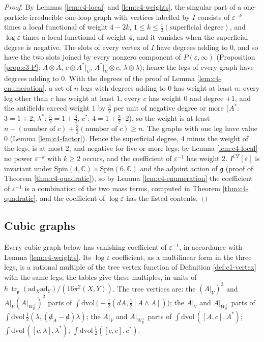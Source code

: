 \begin{proof}
By Lemmas \ref{lem:c4-local} and \ref{lem:c4-weights}, the singular part of a one-particle-irreducible one-loop graph with vertices labelled by $I$ consists of $\varepsilon^{-k}$ times a local functional of weight $4-2k$, $1\le k\le\frac12(\text{superficial degree})$, and $\log\varepsilon$ times a local functional of weight $4$, and it vanishes when the superficial degree is negative. The slots of every vertex of $I$ have degrees adding to $0$, and so have the two slots joined by every nonzero component of $P(\varepsilon,\infty)$ (Proposition \ref{prop:c3-P}: $A\otimes A$, $c\otimes A^*|_V$, $A^*|_V\otimes c$, $\lambda\otimes\lambda$); hence the legs of every graph have degrees adding to $0$. With the degrees of the proof of Lemma \ref{lem:c4-enumeration}, a set of $n$ legs with degrees adding to $0$ has weight at least $n$: every leg other than $c$ has weight at least $1$, every $c$ has weight $0$ and degree $+1$, and the antifields exceed weight $1$ by $\tfrac32$ per unit of negative degree or more ($A^*$: $3=1+2$, $\lambda^*$: $\tfrac52=1+\tfrac32$, $c^*$: $4=1+\tfrac32\cdot2$), so the weight is at least $n-(\text{number of }c)+\tfrac32(\text{number of }c)\ge n$. The graphs with one leg have value $0$ (Lemma \ref{lem:c4-factor}). Hence the superficial degree, $4$ minus the weight of the legs, is at most $2$, and negative for five or more legs; by Lemma \ref{lem:c4-local} no power $\varepsilon^{-k}$ with $k\ge2$ occurs, and the coefficient of $\varepsilon^{-1}$ has weight $2$. $I^{CT}[\varepsilon]$ is invariant under $\mathrm{Spin}(4,\mathbb C)\times\mathrm{Spin}(6,\mathbb C)$ and the adjoint action of $\mathfrak g$ (proof of Theorem \ref{thm:c4-quadratic}), so by Lemma \ref{lem:c4-enumeration} the coefficient of $\varepsilon^{-1}$ is a combination of the two mass terms, computed in Theorem \ref{thm:c4-quadratic}, and the coefficient of $\log\varepsilon$ has the listed contents.
\end{proof}

\subsection{Cubic graphs}

Every cubic graph below has vanishing coefficient of $\varepsilon^{-1}$, in accordance with Lemma \ref{lem:c4-weights}. Its $\log\varepsilon$ coefficient, as a multilinear form in the three legs, is a rational multiple of the tree vertex function of Definition \ref{def:c1-vertex} with the same legs; the tables give these multiples, in units of $\hbar\,\operatorname{tr}_{\mathfrak g}(\mathrm{ad}_X\mathrm{ad}_Y)/(16\pi^2(X,Y))$. The tree vertices are: the $(A|_V)^3$ and $A|_V(A|_{W_{\mathbb R}^\perp})^2$ parts of $\int\mathrm{dvol}\,\big(-\tfrac12(dA,\tfrac12[A\wedge A])\big)$; the $A|_V$ and $A|_{W_{\mathbb R}^\perp}$ parts of $\int\mathrm{dvol}\,\tfrac12(\lambda,({\not d}_A-{\not d})\lambda)$; the $A|_V$ and $A|_{W_{\mathbb R}^\perp}$ parts of $\int\mathrm{dvol}\,([A,c],A^*)$; $\int\mathrm{dvol}\,([c,\lambda],\lambda^*)$; $\int\mathrm{dvol}\,\tfrac12([c,c],c^*)$.

